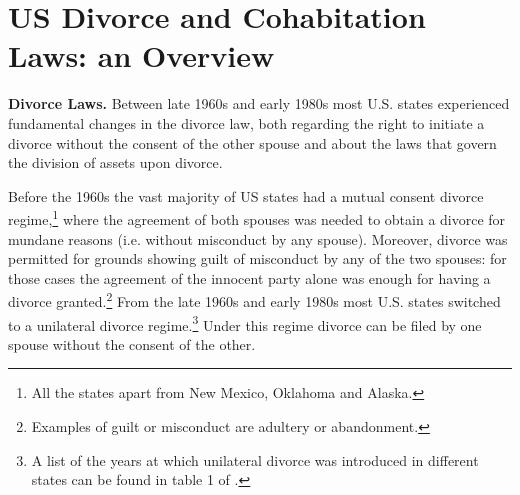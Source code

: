 \documentclass[12pt]{article}
\numberwithin{table}{section}
\begin{document}
%
\section{US Divorce and Cohabitation Laws: an Overview}
\textbf{Divorce Laws.} Between late 1960s and early 1980s most U.S. states experienced fundamental changes in the divorce law, both regarding the right to initiate a divorce without the consent of the other spouse and about the laws that govern the division of assets upon divorce.

Before the 1960s the vast majority of US states had a mutual consent divorce regime,\footnote{All the states apart from New Mexico, Oklahoma and Alaska.} where the agreement of both spouses was needed to obtain a divorce for mundane reasons (i.e. without misconduct by any spouse). Moreover, divorce was permitted for grounds showing guilt of misconduct by any of the two spouses: for those cases the agreement of the innocent party alone was enough for having a divorce granted.\footnote{Examples of guilt or misconduct are adultery or abandonment.}
From the late 1960s and early 1980s most U.S. states switched to a unilateral divorce regime.\footnote{A list of the years at which unilateral divorce was introduced in different states can be found in table 1 of \cite{ciacci2017}.} Under this regime divorce can be filed by one spouse without the consent of the other.
\end{document}

